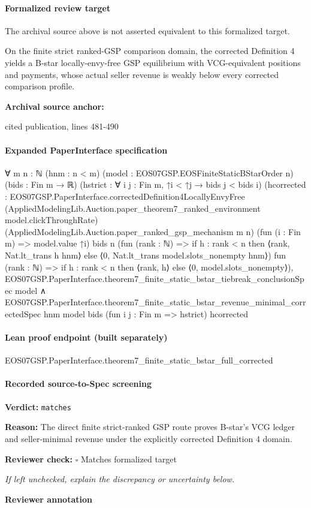 \documentclass[10pt]{article}
\newcommand{\reviewerbox}{%
  \par\noindent\fbox{\parbox{0.96\linewidth}{\rule{0pt}{0.38in}}}\par
}
\newcommand{\reviewmatch}[1]{%
  \par\noindent\textbf{Reviewer check:} $\square$\; #1\par
  \noindent\emph{If left unchecked, explain the discrepancy or uncertainty below.}\par
}
\begin{document}
\paragraph{Formalized review target}
The archival source above is not asserted equivalent to this formalized target.
\begin{ReviewVerbatim}
On the finite strict ranked-GSP comparison domain, the corrected Definition 4 yields a B-star locally-envy-free GSP equilibrium with VCG-equivalent positions and payments, whose actual seller revenue is weakly below every corrected comparison profile.
\end{ReviewVerbatim}

\textbf{Archival source anchor:} {\footnotesize\raggedright cited publication, lines 481-\allowbreak{}490\par}
\paragraph{Expanded PaperInterface specification}
\begin{ReviewVerbatim}
∀ {m n : ℕ} (hnm : n < m) (model : EOS07GSP.EOSFiniteStaticBStarOrder n) (bids : Fin m → ℝ)
  (hstrict : ∀ {i j : Fin m}, ↑i < ↑j → bids j < bids i)
  (hcorrected :
    EOS07GSP.PaperInterface.correctedDefinition4LocallyEnvyFree
      (AppliedModelingLib.Auction.paper_theorem7_ranked_environment model.clickThroughRate)
      (AppliedModelingLib.Auction.paper_ranked_gsp_mechanism m n) (fun (i : Fin m) => model.value ↑i) bids n
      (fun (rank : ℕ) =>
        if h : rank < n then ⟨rank, Nat.lt_trans h hnm⟩ else ⟨0, Nat.lt_trans model.slots_nonempty hnm⟩)
      fun (rank : ℕ) => if h : rank < n then ⟨rank, h⟩ else ⟨0, model.slots_nonempty⟩),
  EOS07GSP.PaperInterface.theorem7_finite_static_bstar_tiebreak_conclusionSpec model ∧
    EOS07GSP.PaperInterface.theorem7_finite_static_bstar_revenue_minimal_correctedSpec hnm model bids
      (fun {i j : Fin m} => hstrict) hcorrected
\end{ReviewVerbatim}



\paragraph{Lean proof endpoint (built separately)}\begin{ReviewVerbatim}
EOS07GSP.PaperInterface.theorem7_finite_static_bstar_full_corrected
\end{ReviewVerbatim}

\paragraph{Recorded source-to-Spec screening}
\textbf{Verdict:} \texttt{matches}
\\
{\raggedright
\textbf{Reason:} The direct finite strict-\allowbreak{}ranked GSP route proves B-\allowbreak{}star's VCG ledger and seller-\allowbreak{}minimal revenue under the explicitly corrected Definition 4 domain.\allowbreak{}
\par}
\reviewmatch{Matches formalized target}
\noindent\textbf{Reviewer annotation}\par
\reviewerbox
\clearpage
\hypertarget{source-claim-9e64bb65c7fb62ab}{}
\end{document}
